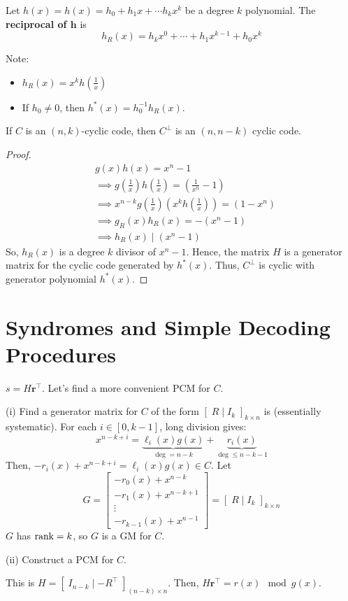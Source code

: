 \begin{defbox}
    \begin{definition}
        Let $ h(x)=h(x)=h_{0}+h_{1} x+\cdots h_k x^{k} $ be a degree $ k $
        polynomial. The \textbf{reciprocal of $\bm{h}$} is
        \[ h_{R}(x)=h_k x^{0}+\cdots+h_{1}x^{k-1}+h_{0}x^{k} \]
    \end{definition}
\end{defbox}
Note:
\begin{itemize}
    \item $ h_R(x)=x^k h\left( \frac{1}{x} \right) $
    \item If $ h_0\neq 0 $, then $ h^*(x)=h_{0}^{-1}h_R(x) $.
\end{itemize}

\begin{thmbox}
    \begin{theorem}
        If $ C $ is an $ (n,k) $-cyclic code, then $ C^{\perp} $ is an
        $ (n,n-k) $ cyclic code.
    \end{theorem}
\end{thmbox}

\begin{proof}
    \begin{align*}
        &g(x)h(x)=x^n-1\\
        &\implies g\left( \frac{1}{x} \right)h\left( \frac{1}{x}  \right)= \left( \frac{1}{x^n}-1 \right)\\
        &\implies x^{n-k}g\left( \frac{1}{x}  \right)\left( x^k h\left( \frac{1}{x} \right) \right)=
        (1-x^n)\\
        &\implies g_R(x)h_R(x)=-(x^n-1)\\
        &\implies h_R(x)\mid (x^n-1)
    \end{align*}
    So, $ h_R(x) $ is a degree $ k $ divisor of $ x^n-1 $. Hence, the matrix
    $ H $ is a generator matrix for the cyclic code generated by $ h^*(x) $.
    Thus, $ C^{\perp} $ is cyclic with generator polynomial $ h^*(x) $.
\end{proof}

\section{Syndromes and Simple Decoding Procedures}
$ s=H\bm{r}^\top $. Let's find a more convenient PCM for $ C $.

(i) Find a generator matrix for $ C $ of the form
$\left[ \; R\mid I_k\; \right]_{k\times n}$ is (essentially systematic).
For each $ i\in [0,k-1] $, long division gives:
\[ x^{n-k+i}=
\underbrace{\ell_i(x)g(x)}_{\deg=n-k}+\underbrace{r_i(x)}_{\deg\leqslant n-k-1} \]
Then, $ -r_i(x)+x^{n-k+i}=\ell_i(x)g(x)\in C $.
Let
\[ G=
\begin{bmatrix}
    -r_0(x)+x^{n-k}\\
    -r_1(x)+x^{n-k+1}\\
    \vdots\\
    -r_{k-1}(x)+x^{n-1}
\end{bmatrix}=\left[ \; R\mid I_k\; \right]_{k\times n}\]
$ G $ has $ \operatorname{rank}=k $, so $ G $ is a GM for $ C $.

(ii) Construct a PCM for $ C $.

This is $ H=\left[ \; I_{n-k}\mid -R^{\top}\; \right]_{(n-k)\times n} $.
Then, $ H\bm{r}^\top=r(x)\mod g(x) $.
